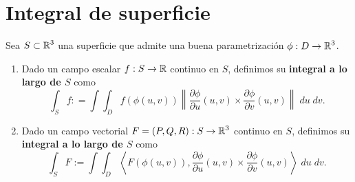 \section{Integral de superficie}
\begin{definition}
Sea $\displaystyle S \subset \mathbb{R}^{3} $ una superficie que admite una buena parametrización $\displaystyle \phi : D \to \mathbb{R}^{3} $. 
\begin{enumerate}
\item Dado un campo escalar $\displaystyle f : S \to \mathbb{R} $ continuo en $\displaystyle S $, definimos su \textbf{integral a lo largo de $\displaystyle S $} como
	\[\int _{S}f : = \int \int _{D}f\left(\phi\left(u,v\right)\right)\left\|\frac{\partial\phi}{\partial u} \left(u,v\right) \times \frac{\partial \phi}{\partial v}\left(u,v\right)\right\| \; du \; dv .\]
\item Dado un campo vectorial $\displaystyle F = \left(P,Q, R\right) : S \to \mathbb{R}^{3} $ continuo en $\displaystyle S $, definimos su \textbf{integral a lo largo de $\displaystyle S $} como 
	\[\int _{S}F := \int \int _{D}\left\langle F\left(\phi\left(u,v\right)\right), \frac{\partial \phi}{\partial u}\left(u,v\right) \times \frac{\partial \phi}{\partial v}\left(u,v\right) \right\rangle  \; du \; dv .\]
\end{enumerate}
\end{definition}
